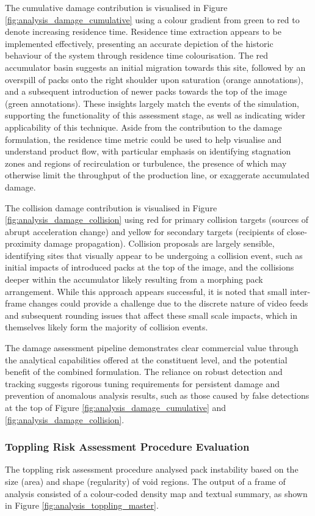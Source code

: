 \documentclass[10pt]{article}
\begin{document}
The cumulative damage contribution is visualised in Figure \ref{fig:analysis_damage_cumulative} using a colour gradient from green to red to denote increasing residence time. Residence time extraction appears to be implemented effectively, presenting an accurate depiction of the historic behaviour of the system through residence time colourisation. The red accumulator basin suggests an initial migration towards this site, followed by an overspill of packs onto the right shoulder upon saturation (orange annotations), and a subsequent introduction of newer packs towards the top of the image (green annotations). These insights largely match the events of the simulation, supporting the functionality of this assessment stage, as well as indicating wider applicability of this technique. Aside from the contribution to the damage formulation, the residence time metric could be used to help visualise and understand product flow, with particular emphasis on identifying stagnation zones and regions of recirculation or turbulence, the presence of which may otherwise limit the throughput of the production line, or exaggerate accumulated damage.

The collision damage contribution is visualised in Figure \ref{fig:analysis_damage_collision} using red for primary collision targets (sources of abrupt acceleration change) and yellow for secondary targets (recipients of close-proximity damage propagation). Collision proposals are largely sensible, identifying sites that visually appear to be undergoing a collision event, such as initial impacts of introduced packs at the top of the image, and the collisions deeper within the accumulator likely resulting from a morphing pack arrangement. While this approach appears successful, it is noted that small inter-frame changes could provide a challenge due to the discrete nature of video feeds and subsequent rounding issues that affect these small scale impacts, which in themselves likely form the majority of collision events. 

The damage assessment pipeline demonstrates clear commercial value through the analytical capabilities offered at the constituent level, and the potential benefit of the combined formulation. The reliance on robust detection and tracking suggests rigorous tuning requirements for persistent damage and prevention of anomalous analysis results, such as those caused by false detections at the top of Figure \ref{fig:analysis_damage_cumulative} and \ref{fig:analysis_damage_collision}.

\subsubsection{Toppling Risk Assessment Procedure Evaluation}
The toppling risk assessment procedure analysed pack instability based on the size (area) and shape (regularity) of void regions. The output of a frame of analysis consisted of a colour-coded density map and textual summary, as shown in Figure \ref{fig:analysis_toppling_master}.
\end{document}
